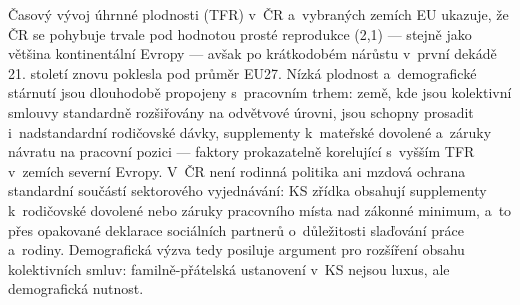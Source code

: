 Časový vývoj úhrnné plodnosti (\ac{TFR}) v~ČR a~vybraných zemích \ac{EU} ukazuje, že ČR se pohybuje trvale pod hodnotou prosté reprodukce (2,1) --- stejně jako většina kontinentální Evropy --- avšak po krátkodobém nárůstu v~první dekádě 21. století znovu poklesla pod průměr EU27.
Nízká plodnost a~demografické stárnutí jsou dlouhodobě propojeny s~pracovním trhem: země, kde jsou kolektivní smlouvy standardně rozšiřovány na odvětvové úrovni, jsou schopny prosadit i~nadstandardní rodičovské dávky, supplementy k~mateřské dovolené a~záruky návratu na pracovní pozici --- faktory prokazatelně korelující s~vyšším \ac{TFR} v~zemích severní Evropy.
V~ČR není rodinná politika ani mzdová ochrana standardní součástí sektorového vyjednávání: \ac{KS} zřídka obsahují supplementy k~rodičovské dovolené nebo záruky pracovního místa nad zákonné minimum, a~to přes opakované deklarace sociálních partnerů o~důležitosti slaďování práce a~rodiny.
Demografická výzva tedy posiluje argument pro rozšíření obsahu kolektivních smluv: familně-přátelská ustanovení v~\ac{KS} nejsou luxus, ale demografická nutnost.


